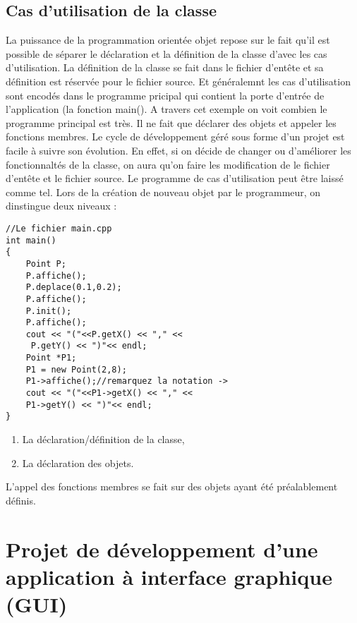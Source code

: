 \documentclass[a4paper, oneside,11pt]{book}
\begin{document}
\subsection*{Cas d'utilisation de la classe}
La puissance de la programmation orient\'ee objet repose sur le fait qu'il est 
possible de s\'eparer le d\'eclaration et la d\'efinition de la classe d'avec les 
cas d'utilisation.
La d\'efinition de la classe se fait dans le fichier d'ent\^ete et sa d\'efinition est r\'eserv\'ee pour le fichier source. Et g\'en\'eralemnt les cas d'utilisation sont encod\'es
dans le programme pricipal qui contient la porte d'entr\'ee de l'application (la fonction main(). A travers cet exemple on voit combien le programme principal est tr\`es. Il ne fait
que d\'eclarer des objets et appeler les fonctions membres. 
Le cycle de d\'eveloppement g\'er\'e sous forme d'un projet est facile \`a suivre son \'evolution. En effet, si on d\'ecide de changer ou d'am\'eliorer les fonctionnalt\'es de la 
classe, on aura qu'on faire les modification de le fichier d'ent\^ete et le fichier source. Le programme de cas d'utilisation peut \^etre laiss\'e comme tel. Lors de la cr\'eation
de nouveau objet par le programmeur, on dinstingue deux niveaux :
\begin{lstlisting}
//Le fichier main.cpp
int main()
{
	Point P;
	P.affiche();
	P.deplace(0.1,0.2);
	P.affiche();
	P.init();
	P.affiche();
	cout << "("<<P.getX() << "," <<
	 P.getY() << ")"<< endl;
	Point *P1;
	P1 = new Point(2,8);
	P1->affiche();//remarquez la notation ->
	cout << "("<<P1->getX() << "," << 
	P1->getY() << ")"<< endl;
}
\end{lstlisting}


\begin{enumerate}
\item La d\'eclaration/d\'efinition de la classe,
\item La d\'eclaration des objets.
\end{enumerate}
L'appel des fonctions membres se fait sur des objets ayant \'et\'e pr\'ealablement d\'efinis.


%






\section*{Projet de d\'eveloppement d'une application \`a interface graphique (GUI)}
\end{document}
